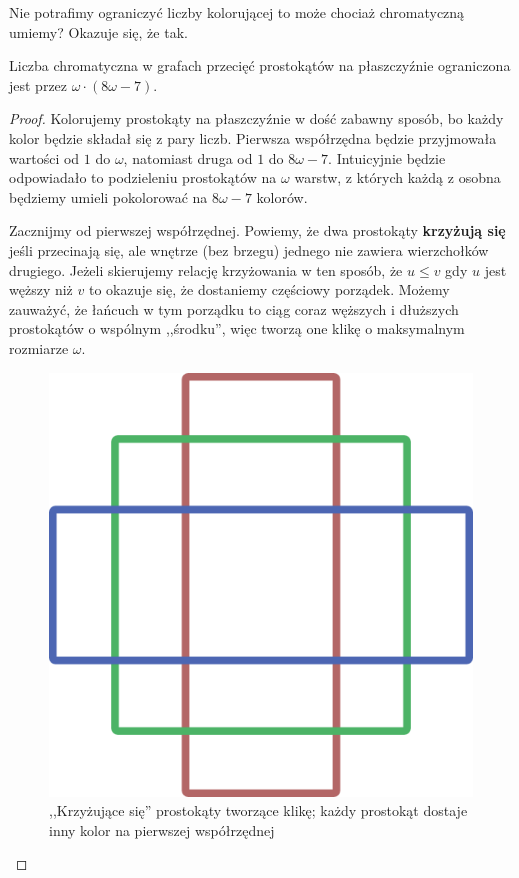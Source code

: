 Nie potrafimy ograniczyć liczby kolorującej to może chociaż chromatyczną umiemy? Okazuje się, że tak.
\begin{theorem}
	Liczba chromatyczna w grafach przecięć prostokątów na płaszczyźnie ograniczona jest przez $\omega \cdot (8\omega - 7)$.
\end{theorem}
\begin{proof}
	Kolorujemy prostokąty na płaszczyźnie w dość zabawny sposób, bo każdy kolor będzie składał się z pary liczb.
	Pierwsza współrzędna będzie przyjmowała wartości od $1$ do $\omega$, natomiast druga od $1$ do $8\omega - 7$.
	Intuicyjnie będzie odpowiadało to podzieleniu prostokątów na $\omega$ warstw, z których każdą z osobna będziemy umieli pokolorować na $8\omega - 7$ kolorów.

	Zacznijmy od pierwszej współrzędnej.
	Powiemy, że dwa prostokąty \textbf{krzyżują się} jeśli przecinają się, ale wnętrze (bez brzegu) jednego nie zawiera wierzchołków drugiego.
	Jeżeli skierujemy relację krzyżowania w ten sposób, że
	$u \leq v$ gdy $u$ jest węższy niż $v$ to okazuje się, że dostaniemy częściowy porządek.
	Możemy zauważyć, że łańcuch w tym porządku to ciąg coraz węższych i dłuższych prostokątów o wspólnym ,,środku'', więc tworzą one klikę o maksymalnym rozmiarze $\omega$.

	\begin{figure}[H]
		\centering
		\includegraphics[scale=0.75]{images/objects_on_plane/rectangle_clique.png}
		\caption{,,Krzyżujące się'' prostokąty tworzące klikę; każdy prostokąt dostaje inny kolor na pierwszej współrzędnej}
	\end{figure}



\end{proof}

